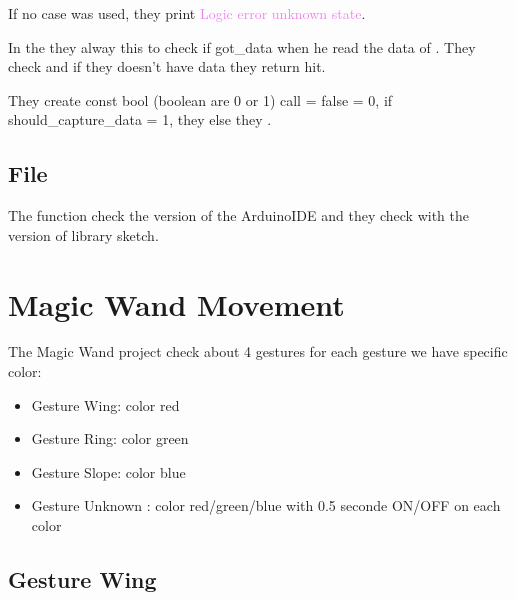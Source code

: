 If no case was used, they print \textcolor{violet}{Logic error unknown state}.

\begin{center}
    \label{Code:Magic Wand function}
\end{center}

In the  they alway this to check if got\_data when he read the data of . They check and if they doesn't have data they return hit. 

They create const bool (boolean are 0 or 1)  call  = false = 0, if should\_capture\_data = 1, they  else they . 

\subsection{File }

The function check the version of the ArduinoIDE and they check with the version of library sketch. 

\begin{center}
    \label{Code:Version}
\end{center}


\section{Magic Wand Movement}

The Magic Wand project check about 4 gestures for each gesture we have specific color: 

\begin{itemize}
    
    \item Gesture Wing: color red
    \item Gesture Ring: color green 
    \item Gesture Slope: color blue
    \item Gesture Unknown : color red/green/blue with 0.5 seconde ON/OFF on each color
\end{itemize}


\subsection{Gesture Wing}

